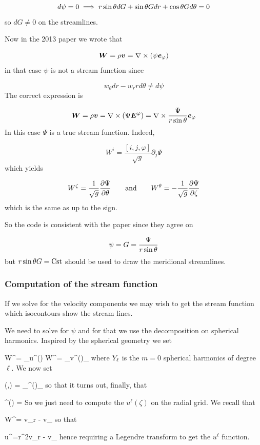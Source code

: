 \[ d\psi= 0 \; \Longrightarrow\; r\sin\theta dG  +\sin\theta Gdr + \cos\theta Gd\theta =0\]
so $dG\neq0$ on the streamlines.

Now in the 2013 paper we wrote that

\[ \vW = \rho\vv = \nabla\times(\psi\ephi)\] 
in that case $\psi$ is not a stream function since

\[ w_\theta dr - w_rrd\theta\neq d\psi\]
The correct expression is

\[ \vW = \rho\vv = \nabla\times(\Psi\vE^\varphi)  = \nabla\times
\frac{\Psi}{r\sth}\ephi\]
In this case $\Psi$ is a true stream function. Indeed,

\[ W^i = \frac{[i,j,\varphi]}{\sqrt{g}}\partial_j\Psi\]
which yields

\[ W^\zeta = \frac{1}{\sqrt{g}}\frac{\partial \Psi}{\partial \theta} \qquad {\rm and}\qquad W^\theta =
-\frac{1}{\sqrt{g}}\frac{\partial \Psi}{\partial \zeta}\]
which is the same as  up to the sign.

So the \ester code is consistent with the paper since they agree on

\[ \psi = G =\frac{\Psi}{r\sin\theta}\]
but $r\sin\theta G = {\rm Cst}$ should be used to draw the meridional streamlines.


\subsubsection{Computation of the stream function}

If we solve for the velocity components we may wish to get the stream
function which isocontours show the stream lines.


We need to solve for $\psi$ and for that we use the decomposition on
spherical harmonics. Inspired by the spherical geometry we set

\beq {}W^\zeta = \sth\sum_\ell u^\ell(\zeta)\YLz\eeq
\beq {}W^\theta = \sth\sum_\ell v^\ell(\zeta)\partial_\theta\YLz\eeq
where $Y_\ell$ is the $m=0$ spherical harmonics of degree $\ell$. We now set

\beq \psi(\zeta,\theta) = \sth\sum_\ell \psi^\ell(\zeta)\partial_\theta\YLz
\eeq
so that it turns out, finally, that

\beq  \psi^\ell(\zeta) = 
\eeq
So we just need to compute the $u^\ell(\zeta)$ on the radial grid. We
recall that

\beq W^\zeta = \lp v_r - v_\theta\rp
\eeq
so that

\beq u^\ell\YLz=\rho r^2\lp v_r - v_\theta\rp\eeq
hence requiring a Legendre transform to get the $u^\ell$ function.

